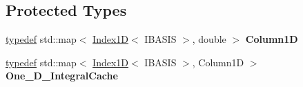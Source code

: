 \subsection*{Protected Types}
\begin{CompactItemize}
\item 
\hypertarget{classFrameTL_1_1SimpleBiharmonicEquation_63df9144382053366de24f606466d2b7}{
\hyperlink{structtypedef}{typedef} std::map$<$ \hyperlink{classFrameTL_1_1Index1D}{Index1D}$<$ IBASIS $>$, double $>$ \textbf{Column1D}}
\label{classFrameTL_1_1SimpleBiharmonicEquation_63df9144382053366de24f606466d2b7}

\item 
\hypertarget{classFrameTL_1_1SimpleBiharmonicEquation_f8ba2d12b7eebf2bfe7d5a51f026e08a}{
\hyperlink{structtypedef}{typedef} std::map$<$ \hyperlink{classFrameTL_1_1Index1D}{Index1D}$<$ IBASIS $>$, Column1D $>$ \textbf{One\_\-D\_\-IntegralCache}}
\label{classFrameTL_1_1SimpleBiharmonicEquation_f8ba2d12b7eebf2bfe7d5a51f026e08a}

\end{CompactItemize}
